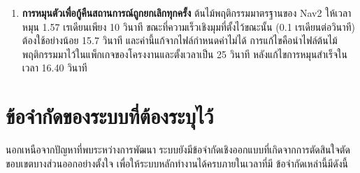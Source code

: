 \documentclass[a4paper,12pt]{report}
\begin{document}
\begin{enumerate}[label=\arabic*., leftmargin=1.25cm, itemsep=6pt, topsep=6pt]
    \item \textbf{การหมุนตัวเพื่อกู้คืนสถานการณ์ถูกยกเลิกทุกครั้ง}
    ต้นไม้พฤติกรรมมาตรฐานของ Nav2 ให้เวลาหมุน 1.57 เรเดียนเพียง 10 วินาที
    ขณะที่ความเร็วเชิงมุมที่ตั้งไว้ขณะนั้น (0.1 เรเดียนต่อวินาที) ต้องใช้อย่างน้อย 15.7 วินาที
    และค่านี้แก้จากไฟล์กำหนดค่าไม่ได้
    การแก้ไขคือนำไฟล์ต้นไม้พฤติกรรมมาไว้ในแพ็กเกจของโครงงานและตั้งเวลาเป็น 25 วินาที
    หลังแก้ไขการหมุนสำเร็จในเวลา 16.40 วินาที
\end{enumerate}

\section{ข้อจำกัดของระบบที่ต้องระบุไว้}

นอกเหนือจากปัญหาที่พบระหว่างการพัฒนา
ระบบยังมีข้อจำกัดเชิงออกแบบที่เกิดจากการตัดสินใจตัดขอบเขตบางส่วนออกอย่างตั้งใจ
เพื่อให้ระบบหลักทำงานได้ครบภายในเวลาที่มี ข้อจำกัดเหล่านี้มีดังนี้
\end{document}
